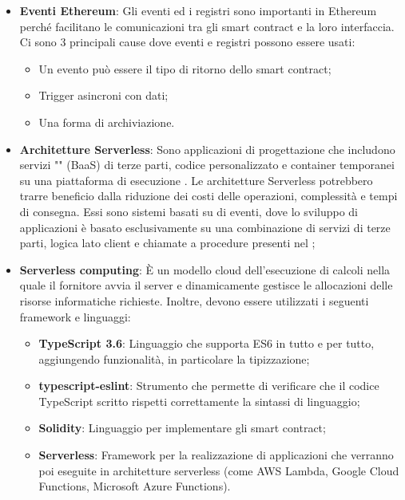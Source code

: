 \begin{itemize}
\item \textbf{Eventi Ethereum}: Gli eventi ed i registri sono importanti in Ethereum perché facilitano le comunicazioni tra gli smart contract e la loro interfaccia.
Ci sono 3 principali cause dove eventi e registri possono essere usati:
\begin{itemize}
\item Un evento può essere il tipo di ritorno dello smart contract;
\item Trigger asincroni con dati;
\item Una forma di archiviazione.
\end{itemize}

\item \textbf{Architetture Serverless}: Sono applicazioni di progettazione che includono servizi "" (BaaS) di terze parti, codice personalizzato e container temporanei su una piattaforma di esecuzione . Le architetture Serverless potrebbero trarre beneficio dalla riduzione dei costi delle operazioni, complessità e tempi di consegna. Essi sono sistemi basati su  di eventi, dove lo sviluppo di applicazioni è basato esclusivamente su una combinazione di servizi di terze parti, logica lato client e chiamate a procedure presenti nel ;
\item \textbf{Serverless computing}: È un modello cloud dell'esecuzione di calcoli nella quale il fornitore  avvia il server e dinamicamente gestisce le allocazioni delle risorse informatiche richieste.
Inoltre, devono essere utilizzati i seguenti framework e linguaggi:
\begin{itemize}
\item \textbf{TypeScript 3.6}: Linguaggio che supporta  ES6 in tutto e per tutto, aggiungendo funzionalità, in particolare la tipizzazione;
\item \textbf{typescript-eslint}: Strumento che permette di verificare che il codice TypeScript scritto rispetti correttamente la sintassi di linguaggio;
\item \textbf{Solidity}: Linguaggio per implementare gli smart contract;
\item \textbf{Serverless}: Framework per la realizzazione di applicazioni che verranno poi eseguite in architetture serverless (come AWS Lambda, Google Cloud Functions, Microsoft Azure Functions).
\end{itemize}

\end{itemize}

